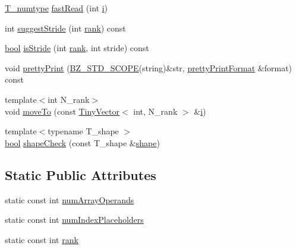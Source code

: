\begin{DoxyCompactItemize}
\item 
\hyperlink{class__bz__FunctorExpr2_a72c49dc29bb54d045667666e72ea96a6}{T\+\_\+numtype} \hyperlink{class__bz__FunctorExpr2_a6de13ebf55580e5e76cd8b9afe988e9b}{fast\+Read} (int \hyperlink{indexexpr_8h_aabd77643995707c185e95c8cb2782c81}{i})
\item 
int \hyperlink{class__bz__FunctorExpr2_aea2315f2c2b93fda09d8882fec0cfbbc}{suggest\+Stride} (int \hyperlink{class__bz__FunctorExpr2_a616c1f8074580cb40a382bd2344319a2}{rank}) const 
\item 
\hyperlink{compiler_8h_abb452686968e48b67397da5f97445f5b}{bool} \hyperlink{class__bz__FunctorExpr2_a8ec4d73a8de22cc00cf4dc5f2389de5f}{is\+Stride} (int \hyperlink{class__bz__FunctorExpr2_a616c1f8074580cb40a382bd2344319a2}{rank}, int stride) const 
\item 
void \hyperlink{class__bz__FunctorExpr2_a2897ff6cc4dc529c58ec7af2e4948cf0}{pretty\+Print} (\hyperlink{numinquire_8h_a2b24ffc3b4ef9803956bc7715c6c7b83}{B\+Z\+\_\+\+S\+T\+D\+\_\+\+S\+C\+O\+P\+E}(string)\&str, \hyperlink{classprettyPrintFormat}{pretty\+Print\+Format} \&format) const 
\item 
{\footnotesize template$<$int N\+\_\+rank$>$ }\\void \hyperlink{class__bz__FunctorExpr2_a0628f3c903271cb5cdf8893806297bc7}{move\+To} (const \hyperlink{classTinyVector}{Tiny\+Vector}$<$ int, N\+\_\+rank $>$ \&\hyperlink{indexexpr_8h_aabd77643995707c185e95c8cb2782c81}{i})
\item 
{\footnotesize template$<$typename T\+\_\+shape $>$ }\\\hyperlink{compiler_8h_abb452686968e48b67397da5f97445f5b}{bool} \hyperlink{class__bz__FunctorExpr2_a1766167f3c0101609d15d717c0f8b6d7}{shape\+Check} (const T\+\_\+shape \&\hyperlink{shape_8h_a9d9da3dcaecbbde6cf1961063f2e838b}{shape})
\end{DoxyCompactItemize}
\subsection*{Static Public Attributes}
\begin{DoxyCompactItemize}
\item 
static const int \hyperlink{class__bz__FunctorExpr2_a6aa783855d43f08337c2383a52a73f91}{num\+Array\+Operands}
\item 
static const int \hyperlink{class__bz__FunctorExpr2_a16d77fdff3f0bda6610cf8885e5044a9}{num\+Index\+Placeholders}
\item 
static const int \hyperlink{class__bz__FunctorExpr2_a616c1f8074580cb40a382bd2344319a2}{rank}
\end{DoxyCompactItemize}
